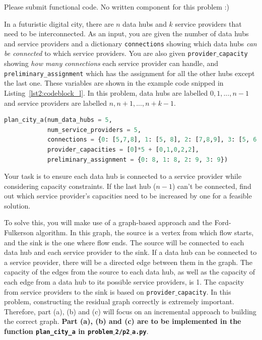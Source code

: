 \documentclass{hw}
\begin{document}
\begin{solution}
Please submit functional code. No written component for this problem :)
\end{solution}

\newpage


\begin{problem}
In a futuristic digital city, there are $n$ data hubs and $k$ service providers that need to be interconnected. As an input, you are given the number of data hubs and service providers and a dictionary \texttt{connections} showing which data hubs \textit{can be connected} to which service providers. You are also given \texttt{provider$\_$capacity} showing \textit{how many connections} each service provider can handle, and \texttt{preliminary\_assignment} which has the assignment for all the other hubs except the last one. These variables are shown in the example code snipped in Listing~\ref{lst2:codeblock_l}. In this problem, data hubs are labelled $0, 1,..., n-1$ and service providers are labelled $n, n+1,..., n+k-1$.
\\
\begin{lstlisting}[language=Python,caption={The python function call to be made to generate the graphs for Problems 2.a,b,c.},label={lst2:codeblock_l},captionpos=b]
plan_city_a(num_data_hubs = 5,
            num_service_providers = 5,
            connections = {0: [5,7,8], 1: [5, 8], 2: [7,8,9], 3: [5, 6, 8, 9], 4: [5,6,7,8]},
            provider_capacities = [0]*5 + [0,1,0,2,2],
            preliminary_assignment = {0: 8, 1: 8, 2: 9, 3: 9})
\end{lstlisting}

Your task is to ensure each data hub is connected to a service provider while considering capacity constraints. If the last hub ($n-1$) can't be connected, find out which service provider's capacities need to be increased by one for a feasible solution.

To solve this, you will make use of a graph-based approach and the Ford-Fulkerson algorithm. In this graph, the source is a vertex from which flow starts, and the sink is the one where flow ends. The source will be connected to each data hub and each service provider to the sink. If a data hub can be connected to a service provider, there will be a directed edge between them in the graph. The capacity of the edges from the source to each data hub, as well as the capacity of each edge from a data hub to its possible service providers, is 1. The capacity from service providers to the sink is based on \texttt{provider$\_$capacity}. In this problem, constructing the residual graph correctly is extremely important. Therefore, part (a), (b) and (c) will focus on an incremental approach to building the correct graph. \textbf{Part (a), (b) and (c) are to be implemented in the function \texttt{plan\_city\_a} in \texttt{problem$\_$2/p2$\_$a.py}}. 


\end{problem}
\end{document}
